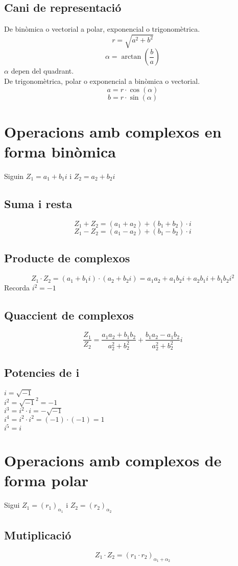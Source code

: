 \documentclass[12pt,a4paper]{article}
\begin{document}
\subsection{Cani de representació}
De binòmica o vectorial a polar, exponencial o trigonomètrica.
$$r=\sqrt{a^2+b^2}$$
$$\alpha=\arctan\left(\frac{b}{a}\right)$$
$\alpha$ depen del quadrant.\\
De trigonomètrica, polar o exponencial a binòmica o vectorial.
$$a=r\cdot\cos(\alpha)$$
$$b=r\cdot\sin(\alpha)$$
\section{Operacions amb complexos en forma binòmica}
Siguin $Z_1=a_1+b_1i$ i $Z_2=a_2+b_2i$
\subsection{Suma i resta}
$$Z_1+Z_2=\left(a_1+a_2\right)+\left(b_1+b_2\right)\cdot i$$
$$Z_1-Z_2=\left(a_1-a_2\right)+\left(b_1-b_2\right)\cdot i$$
\subsection{Producte de complexos}
$$Z_1\cdot Z_2=\left(a_1+b_1i\right)\cdot\left(a_2+b_2i\right)=a_1a_2+a_1b_2i+a_2b_1i+b_1b_2i^2$$
Recorda $i^2=-1$
\subsection{Quaccient de complexos}
$$\frac{Z_1}{Z_2}=\frac{a_1a_2+b_1b_2}{a_2^2+b_2^2}+\frac{b_1a_2-a_1b_2}{a_2^2+b_2^2}i$$
\subsection{Potencies de i}
$i=\sqrt{-1}$\\
$i^2=\sqrt{-1}^2=-1$\\
$i^3=i^2\cdot i =-\sqrt{-1}$\\
$i^4=i^2\cdot i^2 = (-1)\cdot(-1)=1$\\
$i^5=i$
\section{Operacions amb complexos de forma polar}
Sigui $Z_1=\left(r_1\right)_{\alpha_1}$ i $Z_2=\left(r_2\right)_{\alpha_2}$
\subsection{Mutiplicació}
$$Z_1\cdot Z_2 = \left(r_1 \cdot r_2\right)_{\alpha_1+\alpha_2}$$
\end{document}
